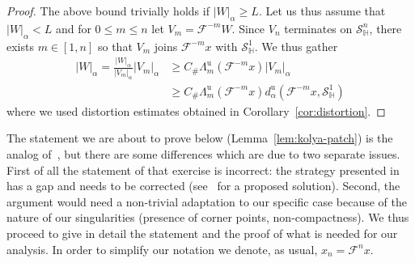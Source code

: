 \documentclass[AHL, Unicode, longabstracts,published]{cedram}
\newcommand{\unstable}{\text{u}}
\newcommand{\homo}{\mathbb{H}}
\newcommand{\cm}{\mathcal{F}}
\newcommand{\dadmPrivate}{d\adm}
\newcommand{\du}{\dadmPrivate^{\unstable}}
\newcommand{\singPrivate}{\mathcal{S}}
\newcommand{\hsing}[1]{{\singPrivate}_\homo^{#1}}
\newcommand{\adm}{_{\alpha^{+}}}
\newcommand{\Const}{C_\#}
\renewcommand{\adm}{_{\alpha}}
\begin{document}
\begin{proof}
The above bound trivially holds if $|W|\adm \ge L$. Let us thus assume that $|W|\adm < L$ and for $0\le m\le n$ let $V_{m} = \cm^{-m}W$. Since $V_{n}$ terminates on $\hsing{n}$, there exists $m\in[1,n]$ so that $V_{m}$ joins $\cm^{-m}x$ with $\hsing{1}$. We thus gather
\begin{align*}
|W|\adm= \frac{|W|\adm}{|V_{m}|\adm}|V_{m}|\adm
&\ge\Const \Lambda_{m}^{\unstable}(\cm^{-m}x) |V_{m}|\adm\\
&\ge\Const \Lambda_{m}^{\unstable}(\cm^{-m}x)\du\left(\cm^{-m}x,\hsing1\right)
\end{align*}
where we used distortion estimates obtained in Corollary~\ref{cor:distortion}.
\end{proof}

The statement we are about to prove below (Lemma~\ref{lem:kolya-patch}) is the analog of~\cite[Exercise~5.69]{ChM}, but there are some differences which are due to two separate issues. First of all the statement of that exercise is incorrect: the strategy presented in~\cite[\S5.5]{ChM} has a gap and needs to be corrected (see~\cite{kolya-patch} for a proposed solution). Second, the argument would need a non-trivial adaptation to our specific case because of the nature of our singularities (presence of corner points, non-compactness). We thus proceed to give in detail the statement and the proof of what is needed for our analysis. In order to simplify our notation we denote, as usual, $x_{n} = \cm^{n}x$.
\end{document}
